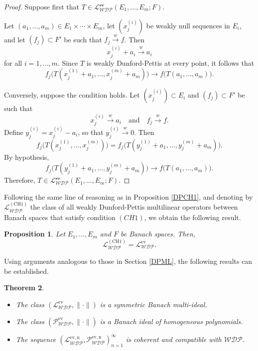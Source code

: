 \documentclass[12 pt]{article}%
\newtheorem{theorem}{Theorem}[section]
\newtheorem{proposition}[theorem]{Proposition}
\newtheorem{final remark}[theorem]{Final Remark}
\begin{document}
\begin{proof}
	Suppose first that $T \in \mathcal{L_{WDP}^{\text{ev}}}(E_1,\dots, E_m; F)$.
	
	Let $(a_1,\dots,a_m)\in E_1\times\cdots\times E_m$, let $(x_j^{(i)})$ be weakly null sequences in $E_i$, and let $(f_j) \subset F'$ be such that $f_j \overset{w}{\longrightarrow} f$. Then
	\[
	x_j^{(i)} + a_i \overset{w}{\longrightarrow} a_i
	\]
	for all $i=1,\dots,m$. Since $T$ is weakly Dunford-Pettis at every point, it follows that
	\[
	f_j\big(T(x_j^{(1)} + a_1,\dots, x_j^{(m)} + a_m)\big)
	\longrightarrow
	f\big(T(a_1,\dots, a_m)\big).
	\]
	
	Conversely, suppose the condition holds. Let $(x_j^{(i)}) \subset E_i$ and $(f_j) \subset F'$ be such that
	\[
	x_j^{(i)} \overset{w}{\longrightarrow} a_i
	\quad \text{and} \quad
	f_j \overset{w}{\longrightarrow} f.
	\]
	Define $y_j^{(i)} = x_j^{(i)} - a_i$, so that $y_j^{(i)} \overset{w}{\longrightarrow} 0$. Then
	\[
	f_j\big(T(x_j^{(1)},\dots,x_j^{(m)})\big)
	=
	f_j\big(T(y_j^{(1)} + a_1,\dots,y_j^{(m)} + a_m)\big).
	\]
	By hypothesis,
	\[
	f_j\big(T(y_j^{(1)} + a_1,\dots,y_j^{(m)} + a_m)\big)
	\longrightarrow
	f\big(T(a_1,\dots,a_m)\big).
	\]
	Therefore, $T \in \mathcal{L_{WDP}^{\text{ev}}}(E_1,\dots,E_m;F)$.
\end{proof}


Following the same line of reasoning as in Proposition \ref{DPCH1}, and denoting by $\mathcal{L_{WDP}^{\mathrm{(CH1)}}}$ the class of all weakly Dunford-Pettis multilinear operators between Banach spaces that satisfy condition $(CH1)$, we obtain the following result.

\begin{proposition}\label{WDPCH1}
	Let $E_1,\dots,E_m$ and $F$ be Banach spaces. Then,
	\[
	\mathcal{L_{WDP}^{\mathrm{(CH1)}}} = \mathcal{L_{WDP}^{\mathrm{ev}}}.
	\]
\end{proposition}

Using arguments analogous to those in Section \ref{DPML}, the following results can be established.

\begin{theorem}
	\begin{itemize}
		\item[(a)] The class $(\mathcal{L_{WDP}^{\mathrm{ev}}}, \|\cdot\|)$ is a symmetric Banach multi-ideal.
		
		\item[(b)] The class $(\mathcal{P_{WDP}^{\mathrm{ev}}}, \|\cdot\|)$ is a Banach ideal of homogeneous polynomials.
		
		\item[(c)] The sequence $(\mathcal{L_{WDP}^{\mathrm{ev,n}}}, \mathcal{P_{WDP}^{\mathrm{ev,n}}})_{n=1}^{\infty}$ is coherent and compatible with $\mathcal{WDP}$.
	\end{itemize}
\end{theorem}
\end{document}
